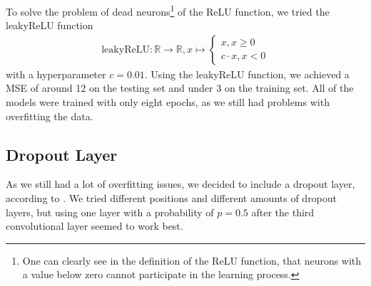 \documentclass[conference]{IEEEtran}
\begin{document}
To solve the problem of dead neurons\footnote{One can clearly see in the definition of the ReLU 
function, that neurons with a value below zero cannot participate in the learning process.} of the ReLU function, we 
tried the leakyReLU function
\begin{align*}
\mathrm{leakyReLU} : \mathbb{R} \to \mathbb{R}, x \mapsto \begin{cases}
x, x \geq 0\\
c \cdot x, x <0
\end{cases}
\end{align*}
with a hyperparameter $c = 0.01$. Using the leakyReLU function, we achieved a MSE of around 12 on the 
testing set and under 3 on the training set. All of the models were trained with only eight epochs, as 
we still had problems with overfitting the data.

\subsection{Dropout Layer}
As we still had a lot of overfitting issues, we decided to include a dropout layer, according to 
\cite{Dropout2014}. We tried different positions and different amounts of dropout layers, but using one 
layer with a probability of $p=0.5$ after the third convolutional layer seemed to work best.
\end{document}
